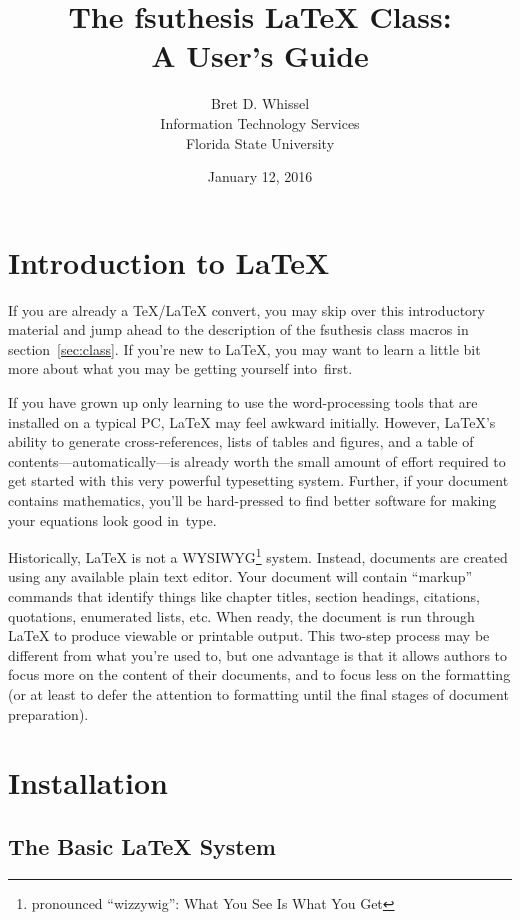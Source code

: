 \documentclass[11pt,letterpaper]{ltxdockit}[2011/03/25]
\title{The \textsf{fsuthesis} \LaTeX{} Class:\\
  A User's Guide}
\author{Bret D. Whissel\\Information Technology Services\\Florida State University}
\date{January 12, 2016}
\newcommand*{\acro}[1]{{\small\textsc{#1}}}
\newcommand*{\pkg}[1]{\textsf{#1}}
\newcommand*{\fsuth}{\pkg{fsuthesis}}
\renewcommand{\-}{\discretionary{}{}{}}
\begin{document}
\maketitle

\tableofcontents

\section{Introduction to \LaTeX}
\label{sec:intro}

If you are already a \TeX/\LaTeX{} convert, you may skip over this
introductory material and jump ahead to the description of the
\fsuth{} class macros in section~\ref{sec:class}.  If you're new to
\LaTeX, you may want to learn a little bit more about what you may be
getting yourself into~first.

If you have grown up only learning to use the word-processing tools
that are installed on a typical PC, \LaTeX{} may feel awkward
initially.  However, \LaTeX's ability to generate cross-references,
lists of tables and figures, and a table of
contents---automatically---is already worth the small amount of effort
required to get started with this very powerful typesetting system.
Further, if your document contains mathematics, you'll be hard-pressed
to find better software for making your equations look good in~type.

Historically, \LaTeX{} is not a \acro{WYSIWYG}\footnote{pronounced
  ``wizzywig'': What You See Is What You Get} system.  Instead,
documents are created using any available plain text editor.  Your
document will contain ``markup'' commands that identify things like
chapter titles, section headings, citations, quotations, enumerated
lists, etc.  When ready, the document is run through \LaTeX{} to
produce viewable or printable output.  This two-step process may be
different from what you're used to, but one advantage is that it
allows authors to focus more on the content of their documents, and to
focus less on the formatting (or at least to defer the attention to
formatting until the final stages of document preparation).

\section{Installation}%
%
\label{sec:install}

\subsection{The Basic \LaTeX{} System}
\end{document}
